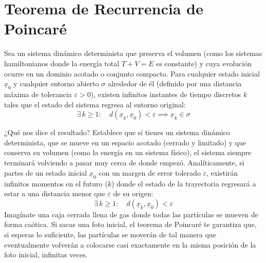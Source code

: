 \documentclass[10pt]{book}
\begin{document}
\section{Teorema de Recurrencia de Poincaré}
\begin{teo}
Sea un sistema dinámico determinista que preserva el volumen (como los sistemas hamiltonianos donde la energía total $T+V=E$ es constante) y cuya evolución ocurre en un dominio acotado o conjunto compacto. Para cualquier estado inicial $\underline{x}_0$ y cualquier entorno abierto $\sigma$ alrededor de él (definido por una distancia máxima de tolerancia $\varepsilon > 0$), existen infinitos instantes de tiempo discretos $k$ tales que el estado del sistema regresa al entorno original:
\begin{equation}
    \exists \, k \geq 1 : \quad d(\underline{x}_k, \underline{x}_0) < \varepsilon \implies \underline{x}_k \in \sigma
\end{equation}
\end{teo}
¿Qué nos dice el resultado? Establece que si tienes un sistema dinámico determinista, que se mueve en un espacio acotado (cerrado y limitado) y que conserva su volumen (como la energía en un sistema físico), el sistema siempre terminará volviendo a pasar muy cerca de donde empezó.  Analíticamente, si partes de un estado inicial $\underline{x}_0$ con un margen de error tolerado $\varepsilon$, existirán infinitos momentos en el futuro ($k$) donde el estado de la trayectoria regresará a estar a una distancia menor que $\varepsilon$ de su origen:
  $$\exists \, k \geq 1 : \quad d(\underline{x}_k, \underline{x}_0) < \varepsilon$$ 
Imagínate una caja cerrada llena de gas donde todas las partículas se mueven de forma caótica. Si sacas una foto inicial, el teorema de Poincaré te garantiza que, si esperas lo suficiente, las partículas se moverán de tal manera que eventualmente volverán a colocarse casi exactamente en la misma posición de la foto inicial, infinitas veces.  \\
\end{document}
